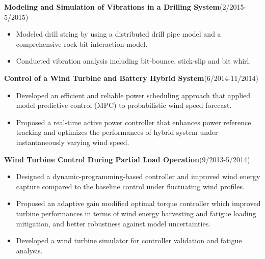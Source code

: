 \documentclass[margin, 9pt]{res} %
\begin{document}
\begin{resume}
\medskip
{\large\textbf{Modeling and Simulation of Vibrations in a Drilling System}}\hfill(2/2015-5/2015)\\
\vspace*{-10pt}
\begin{itemize}[leftmargin=*] \itemsep -3pt
\vspace*{-5pt}
	\item Modeled drill string by using a distributed drill pipe model and a comprehensive rock-bit interaction model.
	\item Conducted vibration analysis including bit-bounce, stick-slip and bit whirl.
\end{itemize}

\medskip
{\large\textbf{Control of a Wind Turbine and Battery Hybrid System}}\hfill(6/2014-11/2014)\\
\vspace*{-10pt}
\begin{itemize}[leftmargin=*] \itemsep -3pt
\vspace*{-5pt}
	\item Developed an efficient and reliable power scheduling approach that applied model predictive control (MPC) to probabilistic wind speed forecast.
	\item Proposed a real-time active power controller that enhances power reference tracking and optimizes the performances of hybrid system under instantaneously varying wind speed.
\end{itemize}

\medskip
{\large\textbf{Wind Turbine Control During Partial Load Operation}}\hfill(9/2013-5/2014)\\
\vspace*{-10pt}
\begin{itemize}[leftmargin=*] \itemsep -3pt
\vspace*{-5pt}
	\item Designed a dynamic-programming-based controller and improved wind energy capture compared to the baseline control under fluctuating wind profiles.
	\item Proposed an adaptive gain modified optimal torque controller which improved turbine performances in terms of wind energy harvesting and fatigue loading mitigation, and better robustness against model uncertainties.
    \item Developed a wind turbine simulator for controller validation and fatigue analysis.
\end{itemize}



\end{resume}
\end{document}

